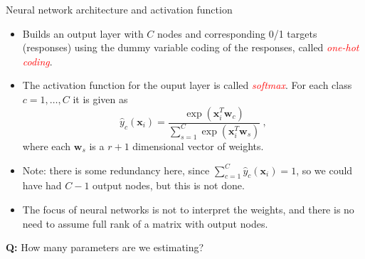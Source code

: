 \documentclass[10pt,ignorenonframetext,]{beamer}
\providecommand{\tightlist}{%
  \setlength{\itemsep}{0pt}\setlength{\parskip}{0pt}}
\begin{document}
\begin{frame}

\begin{block}{Neural network architecture and activation function}

\vspace{4mm}

\begin{itemize}
\tightlist
\item
  Builds an output layer with \(C\) nodes and corresponding 0/1 targets
  (responses) using the dummy variable coding of the responses, called
  \emph{\textcolor{red}{one-hot coding}}.
\end{itemize}

\vspace{2mm}

\begin{itemize}
\tightlist
\item
  The activation function for the ouput layer is called
  \emph{\textcolor{red}{softmax}}. For each class \(c=1,\ldots, C\) it
  is given as \[
  \hat{y}_c({\boldsymbol x}_i) = \frac{\exp({\boldsymbol x}_i^T{\boldsymbol w}_c)}{\sum_{s=1}^{C}\exp({\boldsymbol x}_i^T{\boldsymbol w}_s)} \ ,
  \] where each \({\boldsymbol w}_s\) is a \(r+1\) dimensional vector of
  weights.
\end{itemize}

\vspace{2mm}

\begin{itemize}
\tightlist
\item
  Note: there is some redundancy here, since
  \(\sum_{c=1}^C {\hat y}_{c}({\boldsymbol x}_i)=1\), so we could have
  had \(C-1\) output nodes, but this is not done.
\end{itemize}

\vspace{2mm}

\begin{itemize}
\tightlist
\item
  The focus of neural networks is not to interpret the weights, and
  there is no need to assume full rank of a matrix with output nodes.
\end{itemize}

\vspace{2mm}

\textbf{Q:} How many parameters are we estimating?

\end{block}

\end{frame}
\end{document}
